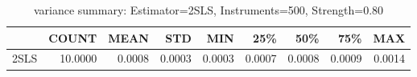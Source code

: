 \begin{table}[ht]
\centering
\caption{variance summary: Estimator=2SLS, Instruments=500, Strength=0.80}
\begin{tabular}{lrrrrrrrr}
\toprule
 & COUNT & MEAN & STD & MIN & 25\% & 50\% & 75\% & MAX \\
\midrule
2SLS & 10.0000 & 0.0008 & 0.0003 & 0.0003 & 0.0007 & 0.0008 & 0.0009 & 0.0014 \\
\bottomrule
\end{tabular}
\end{table}
